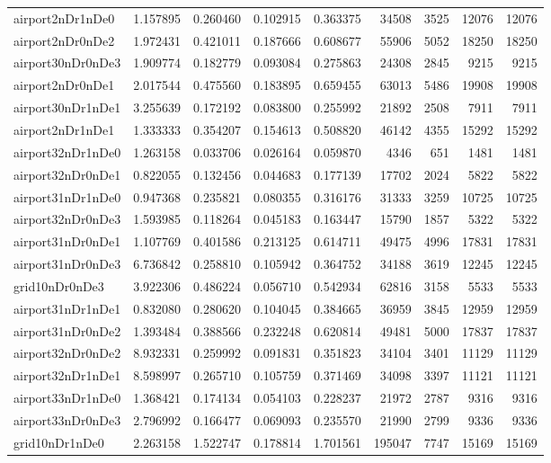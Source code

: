 \begin{longtable}{|l|r|r|r|r|r|r|r|r|}
airport2nDr1nDe0 & 1.157895 & 0.260460 & 0.102915 & 0.363375 & 34508 & 3525 & 12076 & 12076 \\
airport2nDr0nDe2 & 1.972431 & 0.421011 & 0.187666 & 0.608677 & 55906 & 5052 & 18250 & 18250 \\
airport30nDr0nDe3 & 1.909774 & 0.182779 & 0.093084 & 0.275863 & 24308 & 2845 & 9215 & 9215 \\
airport2nDr0nDe1 & 2.017544 & 0.475560 & 0.183895 & 0.659455 & 63013 & 5486 & 19908 & 19908 \\
airport30nDr1nDe1 & 3.255639 & 0.172192 & 0.083800 & 0.255992 & 21892 & 2508 & 7911 & 7911 \\
airport2nDr1nDe1 & 1.333333 & 0.354207 & 0.154613 & 0.508820 & 46142 & 4355 & 15292 & 15292 \\
airport32nDr1nDe0 & 1.263158 & 0.033706 & 0.026164 & 0.059870 & 4346 & 651 & 1481 & 1481 \\
airport32nDr0nDe1 & 0.822055 & 0.132456 & 0.044683 & 0.177139 & 17702 & 2024 & 5822 & 5822 \\
airport31nDr1nDe0 & 0.947368 & 0.235821 & 0.080355 & 0.316176 & 31333 & 3259 & 10725 & 10725 \\
airport32nDr0nDe3 & 1.593985 & 0.118264 & 0.045183 & 0.163447 & 15790 & 1857 & 5322 & 5322 \\
airport31nDr0nDe1 & 1.107769 & 0.401586 & 0.213125 & 0.614711 & 49475 & 4996 & 17831 & 17831 \\
airport31nDr0nDe3 & 6.736842 & 0.258810 & 0.105942 & 0.364752 & 34188 & 3619 & 12245 & 12245 \\
grid10nDr0nDe3 & 3.922306 & 0.486224 & 0.056710 & 0.542934 & 62816 & 3158 & 5533 & 5533 \\
airport31nDr1nDe1 & 0.832080 & 0.280620 & 0.104045 & 0.384665 & 36959 & 3845 & 12959 & 12959 \\
airport31nDr0nDe2 & 1.393484 & 0.388566 & 0.232248 & 0.620814 & 49481 & 5000 & 17837 & 17837 \\
airport32nDr0nDe2 & 8.932331 & 0.259992 & 0.091831 & 0.351823 & 34104 & 3401 & 11129 & 11129 \\
airport32nDr1nDe1 & 8.598997 & 0.265710 & 0.105759 & 0.371469 & 34098 & 3397 & 11121 & 11121 \\
airport33nDr1nDe0 & 1.368421 & 0.174134 & 0.054103 & 0.228237 & 21972 & 2787 & 9316 & 9316 \\
airport33nDr0nDe3 & 2.796992 & 0.166477 & 0.069093 & 0.235570 & 21990 & 2799 & 9336 & 9336 \\
grid10nDr1nDe0 & 2.263158 & 1.522747 & 0.178814 & 1.701561 & 195047 & 7747 & 15169 & 15169 \\

\end{longtable}
